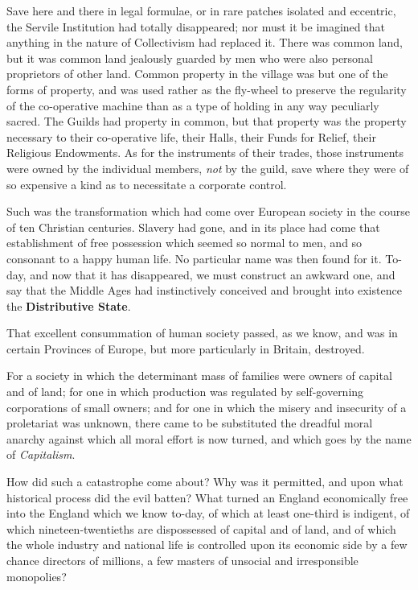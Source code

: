 \documentclass{book}
\begin{document}
Save here and there in legal formulae, or in rare patches isolated and eccentric, the Servile Institution had totally disappeared; nor must it be imagined that anything in the nature of Collectivism had replaced it. There was common land, but it was common land jealously guarded by men who were also personal proprietors of other land. Common property in the village was but one of the forms of property, and was used rather as the fly-wheel to preserve the regularity of the co-operative machine than as a type of holding in any way peculiarly sacred. The Guilds had property in common, but that property was the property necessary to their co-operative life, their Halls, their Funds for Relief, their Religious Endowments. As for the instruments of their trades, those instruments were owned by the individual members, \emph{not} by the guild, save where they were of so expensive a kind as to necessitate a corporate control.

Such was the transformation which had come over European society in the course of ten Christian centuries. Slavery had gone, and in its place had come that establishment of free possession which seemed so normal to men, and so consonant to a happy human life. No particular name was then found for it. To-day, and now that it has disappeared, we must construct an awkward one, and say that the Middle Ages had instinctively conceived and brought into existence the \textbf{Distributive State}.

That excellent consummation of human society passed, as we know, and was in certain Provinces of Europe, but more particularly in Britain, destroyed.

For a society in which the determinant mass of families were owners of capital and of land; for one in which production was regulated by self-governing corporations of small owners; and for one in which the misery and insecurity of a proletariat was unknown, there came to be substituted the dreadful moral anarchy against which all moral effort is now turned, and which goes by the name of \emph{Capitalism}.

How did such a catastrophe come about? Why was it permitted, and upon what historical process did the evil batten? What turned an England economically free into the England which we know to-day, of which at least one-third is indigent, of which nineteen-twentieths are dispossessed of capital and of land, and of which the whole industry and national life is controlled upon its economic side by a few chance directors of millions, a few masters of unsocial and irresponsible monopolies?
\end{document}
